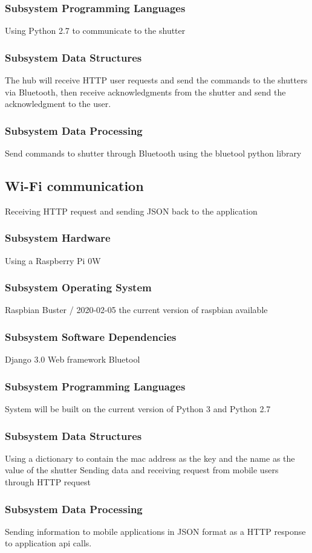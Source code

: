 \subsubsection{Subsystem Programming Languages}
Using Python 2.7 to communicate to the shutter

\subsubsection{Subsystem Data Structures}
The hub will receive HTTP user requests and send the commands to the shutters via Bluetooth, then receive acknowledgments from the shutter and send the acknowledgment to the user. 

\subsubsection{Subsystem Data Processing}
Send commands to shutter through Bluetooth using the bluetool python library

\subsection{Wi-Fi communication}
Receiving HTTP request and sending JSON back to the application

\subsubsection{Subsystem Hardware}
Using a Raspberry Pi 0W

\subsubsection{Subsystem Operating System}
Raspbian Buster / 2020-02-05 the current version of raspbian available

\subsubsection{Subsystem Software Dependencies}
Django 3.0 Web framework
Bluetool


\subsubsection{Subsystem Programming Languages}
System will be built on the current version of Python 3 and Python 2.7

\subsubsection{Subsystem Data Structures}
Using a dictionary to contain the mac address as the key and the name as the value of the shutter
Sending data and receiving request from mobile users through HTTP request

\subsubsection{Subsystem Data Processing}
Sending information to mobile applications in JSON format as a HTTP response to application api calls.


